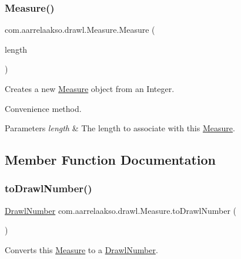 \subsubsection{\texorpdfstring{Measure()}{Measure()}\hspace{0.1cm}{\footnotesize\ttfamily [2/2]}}
{\footnotesize\ttfamily com.\+aarrelaakso.\+drawl.\+Measure.\+Measure (\begin{DoxyParamCaption}\item[{@Not\+Null Integer}]{length }\end{DoxyParamCaption})}



Creates a new \hyperlink{classcom_1_1aarrelaakso_1_1drawl_1_1_measure}{Measure} object from an Integer. 

Convenience method.


\begin{DoxyParams}{Parameters}
{\em length} & The length to associate with this \hyperlink{classcom_1_1aarrelaakso_1_1drawl_1_1_measure}{Measure}. \\
\hline
\end{DoxyParams}


\subsection{Member Function Documentation}
\mbox{\label{classcom_1_1aarrelaakso_1_1drawl_1_1_measure_a847bbfcc708d3ff19c89c5303cf69543}} 
\subsubsection{\texorpdfstring{to\+Drawl\+Number()}{toDrawlNumber()}}
{\footnotesize\ttfamily \hyperlink{classcom_1_1aarrelaakso_1_1drawl_1_1_drawl_number}{Drawl\+Number} com.\+aarrelaakso.\+drawl.\+Measure.\+to\+Drawl\+Number (\begin{DoxyParamCaption}{ }\end{DoxyParamCaption})\hspace{0.3cm}{\ttfamily [protected]}}



Converts this \hyperlink{classcom_1_1aarrelaakso_1_1drawl_1_1_measure}{Measure} to a \hyperlink{classcom_1_1aarrelaakso_1_1drawl_1_1_drawl_number}{Drawl\+Number}. 

